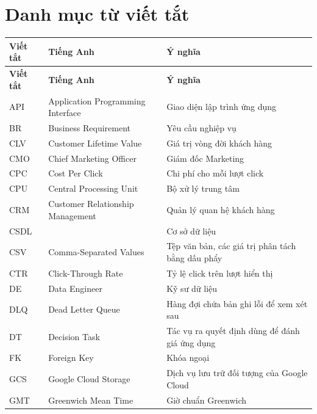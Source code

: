 \chapter*{Danh mục từ viết tắt}

\begingroup
\small
\renewcommand{\arraystretch}{1.18}
\setlength{\LTpre}{0pt}
\noindent
\begin{longtable}{@{}>{\raggedright\arraybackslash}p{1.9cm} >{\raggedright\arraybackslash}p{5.4cm} >{\raggedright\arraybackslash}p{7.7cm}@{}}
\toprule
\textbf{Viết tắt} & \textbf{Tiếng Anh} & \textbf{Ý nghĩa} \\
\midrule
\endfirsthead
\toprule
\textbf{Viết tắt} & \textbf{Tiếng Anh} & \textbf{Ý nghĩa} \\
\midrule
\endhead
\bottomrule
\endfoot
API & Application Programming Interface & Giao diện lập trình ứng dụng \\
BR & Business Requirement & Yêu cầu nghiệp vụ \\
CLV & Customer Lifetime Value & Giá trị vòng đời khách hàng \\
CMO & Chief Marketing Officer & Giám đốc Marketing \\
CPC & Cost Per Click & Chi phí cho mỗi lượt click \\
CPU & Central Processing Unit & Bộ xử lý trung tâm \\
CRM & Customer Relationship Management & Quản lý quan hệ khách hàng \\
CSDL & & Cơ sở dữ liệu \\
CSV & Comma-Separated Values & Tệp văn bản, các giá trị phân tách bằng dấu phẩy \\
CTR & Click-Through Rate & Tỷ lệ click trên lượt hiển thị \\
DE & Data Engineer & Kỹ sư dữ liệu \\
DLQ & Dead Letter Queue & Hàng đợi chứa bản ghi lỗi để xem xét sau \\
DT & Decision Task & Tác vụ ra quyết định dùng để đánh giá ứng dụng \\
FK & Foreign Key & Khóa ngoại \\
GCS & Google Cloud Storage & Dịch vụ lưu trữ đối tượng của Google Cloud \\
GMT & Greenwich Mean Time & Giờ chuẩn Greenwich \\

\end{longtable}
